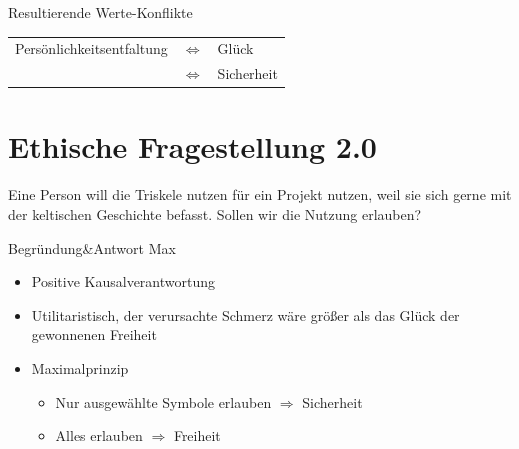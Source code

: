 \documentclass{cubeamer}
\begin{document}
\begin{frame}{Resultierende Werte-Konflikte}
    \begin{center}
        \begin{tabular}{ r c l }
         Persönlichkeitsentfaltung & \(\Leftrightarrow\) & Glück \\
         \only<2->{Freiheit & \(\Leftrightarrow\) & Sicherheit}
        \end{tabular}
    \end{center}
\end{frame}

\section{Ethische Fragestellung 2.0}

\begin{frame}
   \large Eine Person will die Triskele nutzen für ein Projekt nutzen, weil sie sich gerne mit der keltischen Geschichte befasst. Sollen wir die Nutzung erlauben?
\end{frame}

\begin{frame}{Begründung\&Antwort Max}
    \begin{itemize}
        \item Positive Kausalverantwortung
        \item Utilitaristisch, der verursachte Schmerz wäre größer als das Glück der gewonnenen Freiheit
        \item Maximalprinzip
        \begin{itemize}
            \item Nur ausgewählte Symbole erlauben \(\Rightarrow\) Sicherheit
            \item Alles erlauben \(\Rightarrow\) Freiheit
        \end{itemize}
    \end{itemize}
\end{frame}
\end{document}
